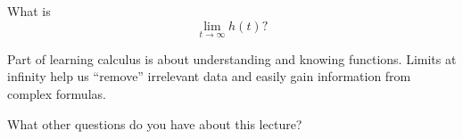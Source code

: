 \documentclass{ximera}
\begin{document}
\begin{problem}
What is 
\[
\lim_{t\to\infty} h(t)?
\]
\begin{multipleChoice}
\end{multipleChoice}
\end{problem}

Part of learning calculus is about understanding and knowing
functions. Limits at infinity help us ``remove'' irrelevant data and
easily gain information from complex formulas.

\begin{problem}
What other questions do you have about this lecture?
\begin{freeResponse}
\end{freeResponse}
\end{problem}
\end{document}
